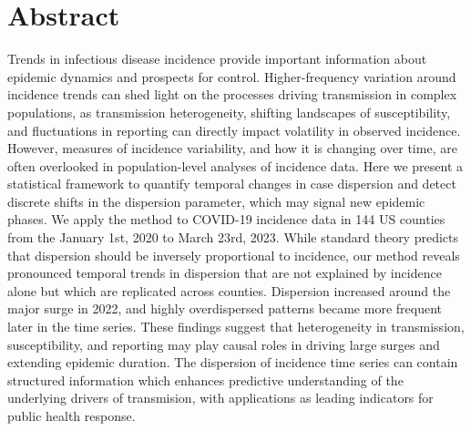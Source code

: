 \documentclass[10pt,letterpaper]{article}
\begin{document}
\section*{Abstract}
Trends in infectious disease incidence provide important information about epidemic dynamics and prospects for control. 
Higher-frequency variation around incidence trends can shed light on the processes driving transmission in complex populations, as transmission heterogeneity, shifting landscapes of susceptibility, and fluctuations in reporting can directly impact volatility in observed incidence.
However, measures of incidence variability, and how it is changing over time, are often overlooked in population-level analyses of incidence data.
Here we present a statistical framework to quantify temporal changes in case dispersion and detect discrete shifts in the dispersion parameter, which may signal new epidemic phases. 
We apply the method to COVID-19 incidence data in 144 US counties from the January 1st, 2020 to March 23rd, 2023.
While standard theory predicts that dispersion should be inversely proportional to incidence, our method reveals pronounced temporal trends in dispersion that are not explained by incidence alone but which are replicated across counties. 
Dispersion increased around the major surge in 2022, and highly overdispersed patterns became more frequent later in the time series.
These findings suggest that heterogeneity in transmission, susceptibility, and reporting may play causal roles in driving large surges and extending epidemic duration. 
The dispersion of incidence time series can contain structured information which enhances predictive understanding of the underlying drivers of transmision, with applications as leading indicators for public health response.



\end{document}
